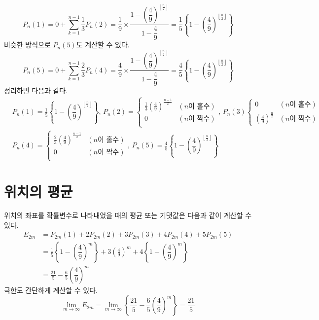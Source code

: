 \documentclass{scrartcl}
\begin{document}
\[P_n(1)=0+\sum^{n-1}_{k=1}\frac{1}{3}P_n(2)=\frac{1}{9}\times\frac{1-\left(\dfrac{4}{9}\right)^{\left\lfloor\frac{n}{2}\right\rfloor}}{1-\dfrac{4}{9}}=\frac{1}{5}\left\{1-\left(\dfrac{4}{9}\right)^{\left\lfloor\frac{n}{2}\right\rfloor}\right\}\]
비슷한 방식으로 \(P_n(5)\)도 계산할 수 있다.
\[P_n(5)=0+\sum^{n-1}_{k=1}\frac{2}{3}P_n(4)=\frac{4}{9}\times\frac{1-\left(\dfrac{4}{9}\right)^{\left\lfloor\frac{n}{2}\right\rfloor}}{1-\dfrac{4}{9}}=\frac{4}{5}\left\{1-\left(\dfrac{4}{9}\right)^{\left\lfloor\frac{n}{2}\right\rfloor}\right\}\]
정리하면 다음과 같다.
\begin{align*}&P_n(1)=\frac{1}{5}\left\{1-\left(\dfrac{4}{9}\right)^{\left\lfloor\frac{n}{2}\right\rfloor}\right\},\,P_n(2)=\begin{cases}
           \frac{1}{3}\left(\frac{4}{9}\right)^\frac{n-1}{2} & (n\text{이 홀수}) \\
           0 & (n\text{이 짝수}) \\
         \end{cases},\,P_n(3)\begin{cases}
           0 & (n\text{이 홀수})\\
           \left(\frac{4}{9}\right)^\frac{n}{2} & (n\text{이 짝수})
         \end{cases}\\
&P_n(4)=\begin{cases}
                                \frac{2}{3}\left(\frac{4}{9}\right)^\frac{n-1}{2} & (n\text{이 홀수}) \\
                                0 & (n\text{이 짝수}) \\
                              \end{cases},\,P_n(5)=\frac{4}{5}\left\{1-\left(\dfrac{4}{9}\right)^{\left\lfloor\frac{n}{2}\right\rfloor}\right\}\end{align*}

\section{위치의 평균}
위치의 좌표를 확률변수로 나타내었을 때의 평균 또는 기댓값은 다음과 같이 계산할 수 있다.
\begin{align*}
E_{2m}&=P_{2m}(1)+2P_{2m}(2)+3P_{2m}(3)+4P_{2m}(4)+5P_{2m}(5) \\
&=\frac{1}{5}\left\{1-\left(\dfrac{4}{9}\right)^{m}\right\}+3\left(\frac{4}{9}\right)^m+4\left\{1-\left(\dfrac{4}{9}\right)^m\right\} \\
&=\boxed{\frac{21}{5}-\frac{6}{5}\left(\dfrac{4}{9}\right)^m}
\end{align*}
극한도 간단하게 계산할 수 있다.
\[\lim_{m\to\infty}E_{2m}=\lim_{m\to\infty}\left\{\frac{21}{5}-\frac{6}{5}\left(\dfrac{4}{9}\right)^m\right\}=\boxed{\frac{21}{5}}\]
\end{document}
